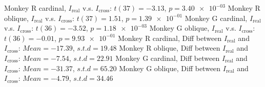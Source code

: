 Monkey R cardinal, $I_\textrm{real}$ v.s. $I_\textrm{cross}$: $t(37) = -3.13$, $p = \num{3.40e-03}$ 
Monkey R oblique, $I_\textrm{real}$ v.s. $I_\textrm{cross}$: $t(37) = 1.51$, $p = \num{1.39e-01}$ 
Monkey G cardinal, $I_\textrm{real}$ v.s. $I_\textrm{cross}$: $t(36) = -3.52$, $p = \num{1.18e-03}$ 
Monkey G oblique, $I_\textrm{real}$ v.s. $I_\textrm{cross}$: $t(36) = -0.01$, $p = \num{9.93e-01}$ 
Monkey R cardinal, Diff between $I_\textrm{real}$ and $I_\textrm{cross}$: $Mean = -17.39$, $s.t.d = 19.48$
Monkey R oblique, Diff between $I_\textrm{real}$ and $I_\textrm{cross}$: $Mean = -7.54$, $s.t.d = 22.91$
Monkey G cardinal, Diff between $I_\textrm{real}$ and $I_\textrm{cross}$: $Mean = -31.37$, $s.t.d = 65.20$
Monkey G oblique, Diff between $I_\textrm{real}$ and $I_\textrm{cross}$: $Mean = -4.79$, $s.t.d = 34.46$

